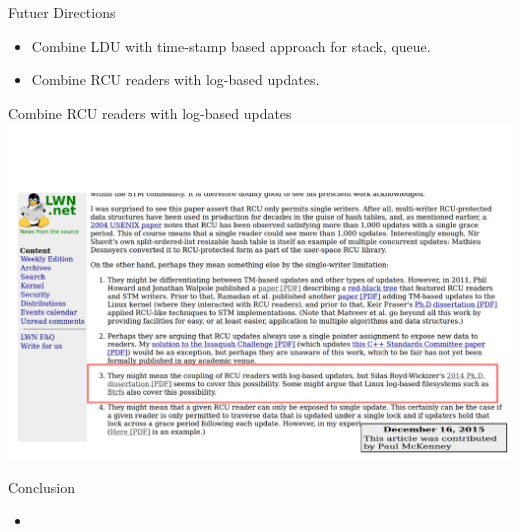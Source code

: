 \documentclass[english]{beamer} %
\begin{document}



\begin{frame}{Futuer Directions}
	\begin{itemize} 
	\item Combine LDU with time-stamp based approach for stack, queue.
	\item Combine RCU readers with log-based updates.
	\end{itemize}
\end{frame}

\begin{frame}{Combine RCU readers with log-based updates}
\includegraphics[scale=0.5]{fig/log-based}
\end{frame}


\begin{frame}{Conclusion}
    \begin{itemize}
    \item {}
    \end{itemize}
\end{frame}
\end{document}
